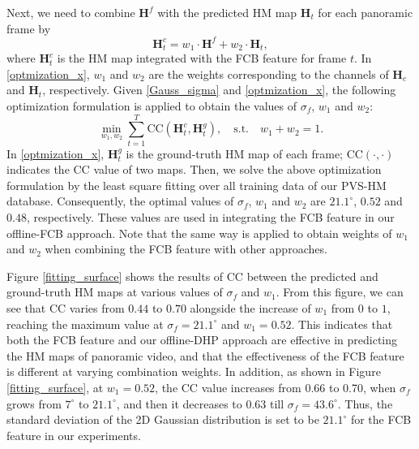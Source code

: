 \documentclass[10pt,journal,compsoc]{IEEEtran}
\begin{document}
Next, we need to combine $\mathbf{H}^f$ with the predicted HM map $\mathbf{H}_t$ for each panoramic frame by
\begin{equation}
\label{optmization_x}
\mathbf{H}^c_t = w_1\cdot \mathbf{H}^f+w_2\cdot \mathbf{H}_t,
\end{equation}
where $\mathbf{H}^c_t$ is the HM map integrated with the FCB feature for frame $t$. In \eqref{optmization_x}, $w_1$ and $w_2$ are the weights corresponding to the channels of $\mathbf{H}_c$ and $\mathbf{H}_t$, respectively. Given \eqref{Gauss_sigma} and \eqref{optmization_x}, the following optimization formulation is applied to obtain the values of $\sigma_f$, $w_1$ and $w_2$:
\begin{equation}
\label{optmization_w}
\min_{w_1,w_2} \sum_{t=1}^{T} \text{CC}(\mathbf{H}^c_t, \mathbf{H}^g_t), \quad \text{s.t.} \quad w_1+w_2=1.
\end{equation}
In \eqref{optmization_x}, $\mathbf{H}^g_t$ is the ground-truth HM map of each frame; $\text{CC}(\cdot,\cdot)$ indicates the CC value of two maps. Then, we solve the above optimization formulation by the least square fitting over all training data of our PVS-HM database. Consequently, the optimal values of $\sigma_f$, $w_1$ and $w_2$ are $21.1^\circ$, $0.52$ and $0.48$, respectively. These values are used in integrating the FCB feature in our offline-FCB approach. Note that the same way is applied to obtain weights of $w_1$ and $w_2$ when combining the FCB feature with other approaches.

Figure \ref{fitting_surface} shows the results of  CC between the predicted and ground-truth HM maps at various values of $\sigma_f$ and $w_1$. From this figure, we can see that CC varies from $0.44$ to $0.70$ alongside the increase of $w_1$ from $0$ to $1$, reaching the maximum value at $\sigma_f=21.1^\circ$ and $w_1=0.52$. This indicates that both the FCB feature and our offline-DHP approach are effective in predicting the HM maps of panoramic video, and that the effectiveness of the FCB feature is different at varying combination weights. In addition, as shown in Figure \ref{fitting_surface}, at $w_1=0.52$, the CC value increases from 0.66 to 0.70, when $\sigma_f$ grows from $7^\circ$ to $21.1^\circ$, and then it decreases to 0.63 till $\sigma_f = 43.6^\circ$. Thus, the standard deviation of the 2D Gaussian distribution is set to be $21.1^\circ$ for the FCB feature in our experiments.
\end{document}
